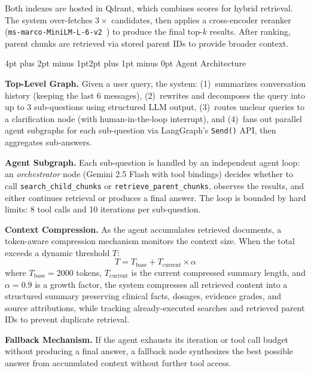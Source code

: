 \documentclass[10pt,twocolumn,letterpaper]{article}
\makeatletter
\renewcommand\subsection{\@startsection{subsection}{2}{\z@}%
  {4pt plus 2pt minus 1pt}{2pt plus 1pt minus 0pt}%
  {\normalsize\bfseries}}
\makeatother
\begin{document}
Both indexes are hosted in Qdrant, which combines scores for hybrid retrieval. The system over-fetches $3\times$ candidates, then applies a cross-encoder reranker (\texttt{ms-marco-MiniLM-L-6-v2}~\cite{nogueira2019passage}) to produce the final top-$k$ results. After ranking, parent chunks are retrieved via stored parent IDs to provide broader context.

\subsection{Agent Architecture}

\textbf{Top-Level Graph.} Given a user query, the system: (1)~summarizes conversation history (keeping the last 6 messages), (2)~rewrites and decomposes the query into up to 3 sub-questions using structured LLM output, (3)~routes unclear queries to a clarification node (with human-in-the-loop interrupt), and (4)~fans out parallel agent subgraphs for each sub-question via LangGraph's \texttt{Send()} API, then aggregates sub-answers.

\textbf{Agent Subgraph.} Each sub-question is handled by an independent agent loop: an \textit{orchestrator} node (Gemini 2.5 Flash with tool bindings) decides whether to call \texttt{search\_child\_chunks} or \texttt{retrieve\_parent\_chunks}, observes the results, and either continues retrieval or produces a final answer. The loop is bounded by hard limits: 8 tool calls and 10 iterations per sub-question.

\textbf{Context Compression.} As the agent accumulates retrieved documents, a token-aware compression mechanism monitors the context size. When the total exceeds a dynamic threshold $T$:
\begin{equation}
T = T_{\text{base}} + T_{\text{current}} \times \alpha
\end{equation}
where $T_{\text{base}} = 2000$ tokens, $T_{\text{current}}$ is the current compressed summary length, and $\alpha = 0.9$ is a growth factor, the system compresses all retrieved content into a structured summary preserving clinical facts, dosages, evidence grades, and source attributions, while tracking already-executed searches and retrieved parent IDs to prevent duplicate retrieval.

\textbf{Fallback Mechanism.} If the agent exhausts its iteration or tool call budget without producing a final answer, a fallback node synthesizes the best possible answer from accumulated context without further tool access.
\end{document}
